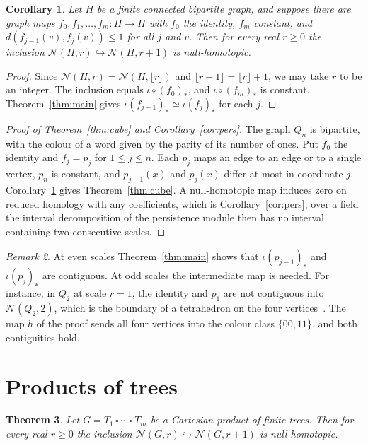 \documentclass[11pt]{amsart}
\newtheorem{theorem}{Theorem}[section]
\newtheorem{corollary}[theorem]{Corollary}
\theoremstyle{remark}
\newtheorem{remark}[theorem]{Remark}
\newcommand{\N}{\mathcal{N}}
\begin{document}
\begin{corollary}\label{cor:chain}
Let $H$ be a finite connected bipartite graph, and suppose there are graph maps $f_0,f_1,\dots,f_m\colon H\to H$ with
$f_0$ the identity, $f_m$ constant, and $d(f_{j-1}(v),f_j(v))\le1$ for all $j$ and $v$. Then for every real $r\ge0$ the
inclusion $\N(H,r)\hookrightarrow\N(H,r+1)$ is null-homotopic.
\end{corollary}

\begin{proof}
Since $\N(H,r)=\N(H,\lfloor r\rfloor)$ and $\lfloor r+1\rfloor=\lfloor r\rfloor+1$, we may take $r$ to be an integer.
The inclusion equals $\iota\circ(f_0)_*$, and $\iota\circ(f_m)_*$ is constant. Theorem~\ref{thm:main} gives
$\iota(f_{j-1})_*\simeq\iota(f_j)_*$ for each $j$.
\end{proof}

\begin{proof}[Proof of Theorem~\ref{thm:cube} and Corollary~\ref{cor:pers}]
The graph $Q_n$ is bipartite, with the colour of a word given by the parity of its number of ones. Put $f_0$ the
identity and $f_j=p_j$ for $1\le j\le n$. Each $p_j$ maps an edge to an edge or to a single vertex, $p_n$ is constant,
and $p_{j-1}(x)$ and $p_j(x)$ differ at most in coordinate $j$. Corollary~\ref{cor:chain} gives
Theorem~\ref{thm:cube}. A null-homotopic map induces zero on reduced homology with any coefficients, which is
Corollary~\ref{cor:pers}; over a field the interval decomposition of the persistence module then has no interval
containing two consecutive scales.
\end{proof}

\begin{remark}
At even scales Theorem~\ref{thm:main} shows that $\iota(p_{j-1})_*$ and $\iota(p_j)_*$ are contiguous. At odd scales the
intermediate map is needed. For instance, in $Q_2$ at scale $r=1$, the identity and $p_1$ are not contiguous into
$\N(Q_2,2)$, which is the boundary of a tetrahedron on the four vertices~\cite[Section~6]{ASS}. The
map $h$ of the proof sends all four vertices into the colour class $\{00,11\}$, and both contiguities hold.
\end{remark}

\section{Products of trees}

\begin{theorem}\label{thm:trees}
Let $G=T_1\,\square\,\cdots\,\square\,T_m$ be a Cartesian product of finite trees. Then for every real $r\ge0$ the
inclusion $\N(G,r)\hookrightarrow\N(G,r+1)$ is null-homotopic.
\end{theorem}
\end{document}
